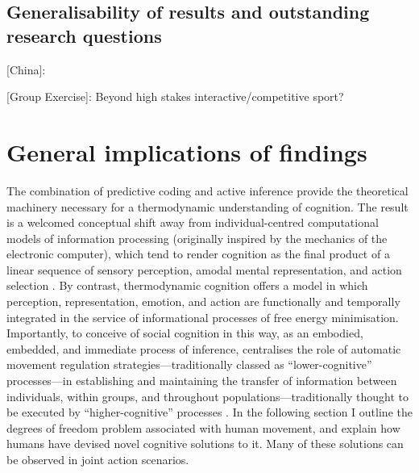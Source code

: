 \subsection{Generalisability of results and outstanding research questions}
[China]:



[Group Exercise]:
  Beyond high stakes interactive/competitive sport?






\section{General implications of findings}




The combination of predictive coding and active inference provide the theoretical machinery necessary for a thermodynamic understanding of cognition.  The result is a welcomed conceptual shift away from individual-centred computational models of information processing (originally inspired by the mechanics of the electronic computer), which tend to render cognition as the final product of a linear sequence of sensory perception, amodal mental representation, and action selection \citep{Lewis2005}.  By contrast, thermodynamic cognition offers a model in which perception, representation, emotion, and action are functionally and temporally integrated in the service of informational processes of free energy minimisation.  Importantly,  to conceive of social cognition in this way, as an embodied, embedded, and immediate process of inference, centralises the role of automatic movement regulation strategies---traditionally classed as ``lower-cognitive'' processes---in establishing and maintaining the transfer of information between individuals, within groups, and throughout populations---traditionally thought to be executed by  ``higher-cognitive'' processes \citep{Claidiere2014}.
In the following section I outline the degrees of freedom problem associated with human movement, and explain how humans have devised novel cognitive solutions to it.  Many of these solutions can be observed in joint action scenarios.


